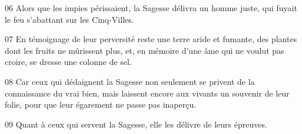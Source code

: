 06 Alors que les impies périssaient, la Sagesse délivra un homme juste, qui fuyait le feu s’abattant sur les Cinq-Villes.

07 En témoignage de leur perversité reste une terre aride et fumante, des plantes dont les fruits ne mûrissent plus, et, en mémoire d’une âme qui ne voulut pas croire, se dresse une colonne de sel.

08 Car ceux qui dédaignent la Sagesse non seulement se privent de la connaissance du vrai bien, mais laissent encore aux vivants un souvenir de leur folie, pour que leur égarement ne passe pas inaperçu.

09 Quant à ceux qui servent la Sagesse, elle les délivre de leurs épreuves.